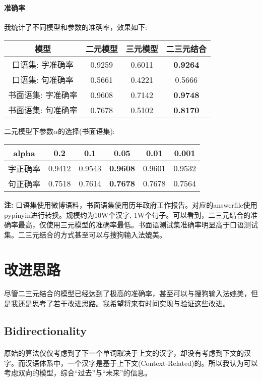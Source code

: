 \documentclass[UTF8, onecolumn, a4paper]{article}
\begin{document}
\paragraph{准确率} 我统计了不同模型和参数的准确率，效果如下:
\begin{center}
\begin{tabular}{|c|c|c|c|}
	\hline
	模型 & 二元模型 & 三元模型 & 二三元结合 \\
	\hline
	口语集: 字准确率 & 0.9259 & 0.6011 & \textbf{0.9264} \\
	\hline
	口语集: 句准确率 & 0.5661 & 0.4221 & 0.5666 \\
	\hline
	书面语集: 字准确率 & 0.9608 & 0.7142 & \textbf{0.9748} \\
	\hline 
	书面语集: 句准确率 & 0.7678 & 0.5102 & \textbf{0.8170} \\
	\hline
\end{tabular}
\end{center}
二元模型下参数$\alpha$的选择(书面语集):
\begin{center}
\begin{tabular}{|c|c|c|c|c|c|}
	\hline
	alpha & 0.2 & 0.1 & 0.05 & 0.01 & 0.001 \\
	\hline
	字正确率 & 0.9412 & 0.9543 & \textbf{0.9608} & 0.9601 & 0.9532 \\
	\hline
	句正确率 & 0.7518 & 0.7614 & \textbf{0.7678} & 0.7678 & 0.7564 \\
	\hline
\end{tabular}
\end{center}

\textbf{注: }口语集使用微博语料，书面语集使用历年政府工作报告。对应的answerfile使用pypinyin进行转换。规模约为10W个汉字, 1W个句子。可以看到，二三元结合的准确率最高，仅使用三元模型的准确率最低。书面语测试集准确率明显高于口语测试集。二三元结合的方式甚至可以与搜狗输入法媲美。
\section{改进思路}
尽管二三元结合的模型已经达到了极高的准确率，甚至可以与搜狗输入法媲美，但是我还是思考了若干改进思路。我希望将来有时间实现与验证这些改进。
\subsection{Bidirectionality}
\paragraph*{}
原始的算法仅仅考虑到了下一个单词取决于上文的汉字，却没有考虑到下文的汉字。而汉语体系中，一个汉字是基于上下文(Context-Related)的。所以我认为可以考虑双向的模型，综合“过去”与“未来”的信息。
\end{document}
